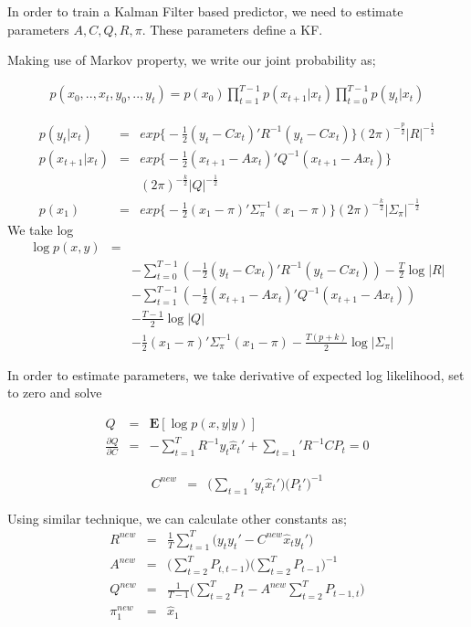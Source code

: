 In order to train a Kalman Filter based predictor, we need to estimate
parameters $A,C,Q,R,\pi$. These parameters define a KF.

Making use of Markov property, we write our joint probability as;

\begin{eqnarray*}
p(x_0,..,x_t,y_0,..,y_t) =
p(x_0)\prod_{t=1}^{T-1}p(x_{t+1}|x_t)\prod_{t=0}^{T-1}p(y_t|x_t)
\end{eqnarray*}

\begin{eqnarray*}
p(y_{t}|x_t) &=& exp
\bigg\{
-\frac{1}{2}(y_{t}-Cx_t) ' R^{-1}(y_{t}-Cx_t)
\bigg\}
(2\pi)^{-\frac{p}{2}}|R|^{-\frac{1}{2}}\\
p(x_{t+1}|x_t) &=& exp
\bigg\{
-\frac{1}{2}(x_{t+1}-Ax_t) ' Q^{-1}(x_{t+1}-Ax_t)
\bigg\} \\
&& (2\pi)^{-\frac{k}{2}}|Q|^{-\frac{1}{2}}\\
p(x_{1}) &=& exp
\bigg\{
-\frac{1}{2}(x_{1}-\pi) ' \Sigma_{\pi}^{-1}(x_{1}-\pi)
\bigg\}
(2\pi)^{-\frac{k}{2}}|\Sigma_{\pi}|^{-\frac{1}{2}}
\end{eqnarray*}
We take log
\begin{eqnarray*}
\log p(x,y) &=& \\
&& -\sum_{t=0}^{T-1}(-\frac{1}{2}(y_{t}-Cx_t) ' R^{-1}(y_{t}-Cx_t)) - \frac{T}{2}\log|R|\\
&& -\sum_{t=1}^{T-1}(-\frac{1}{2}(x_{t+1}-Ax_t) ' Q^{-1}(x_{t+1}-Ax_t))\\
&& - \frac{T-1}{2}\log|Q|\\
&& -\frac{1}{2}(x_{1}-\pi) ' \Sigma_{\pi}^{-1}(x_{1}-\pi) - \frac{T(p+k)}{2}\log|\Sigma_{\pi}|
\end{eqnarray*}

In order to estimate parameters, we take derivative of expected log likelihood,
set to zero and solve

\begin{eqnarray*}
Q &=& \mathbf{E}[\log p(x,y|y)] \\
\frac{\partial Q}{\partial C} &=& -\sum_{t=1}^{T}R^{-1}y_t \hat{x}_{t}' +
\sum_{t=1}' R^{-1} C P_t = 0
\end{eqnarray*}

\begin{eqnarray*}
C^{new} &=& \bigg( \sum_{t=1}' y_t \hat{x}_t' \bigg) \bigg( P_{t}' \bigg) ^{-1}
\end{eqnarray*}

Using similar technique, we can calculate other constants as;
\begin{eqnarray*}
R^{new} &=& \frac{1}{T}\sum_{t=1}^T \big( y_ty_t' - C^{new}\hat{x}_ty_t' \big) \\
A^{new} &=& \big( \sum_{t=2}^T P_{t,t-1})(\sum_{t=2}^TP_{t-1} \big) ^{-1} \\
Q^{new} &=& \frac{1}{T-1} \big( \sum_{t=2}^T P_t - A^{new}\sum_{t=2}^TP_{t-1,t} \big)\\
\pi_1^{new} &=& \hat{x}_1
\end{eqnarray*}


